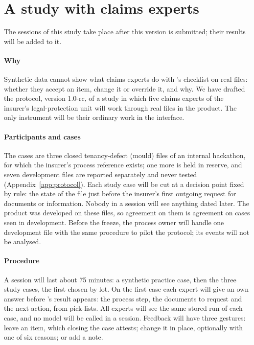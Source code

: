 \section{A study with claims experts}
\label{sec:experts}

The sessions of this study take place after this version is submitted; their results will be added to it.

\paragraph{Why}
Synthetic data cannot show what claims experts do with \casepath's checklist on real files: whether they accept an item, change it or override it, and why. We have drafted the protocol, version 1.0-rc, of a study in which five claims experts of the insurer's legal-protection unit will work through real files in the product. The only instrument will be their ordinary work in the interface.

\paragraph{Participants and cases}
The cases are three closed tenancy-defect (mould) files of an internal hackathon, for which the insurer's process reference exists; one more is held in reserve, and seven development files are reported separately and never tested (Appendix~\ref{app:protocol}). Each study case will be cut at a decision point fixed by rule: the state of the file just before the insurer's first outgoing request for documents or information. Nobody in a session will see anything dated later. The product was developed on these files, so agreement on them is agreement on cases seen in development. Before the freeze, the process owner will handle one development file with the same procedure to pilot the protocol; its events will not be analysed.

\paragraph{Procedure}
A session will last about 75 minutes: a synthetic practice case, then the three study cases, the first chosen by lot. On the first case each expert will give an own answer before \casepath's result appears: the process step, the documents to request and the next action, from pick-lists. All experts will see the same stored run of each case, and no model will be called in a session. Feedback will have three gestures: leave an item, which closing the case attests; change it in place, optionally with one of six reasons; or add a note.

